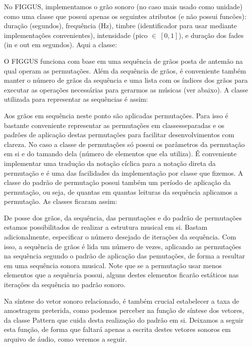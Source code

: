 No FIGGUS, implementamos o grão sonoro (no caso mais usado
como unidade) como uma classe que possui apenas
os seguintes atributos (e não possui funcões): duração (segundos),
frequência (Hz), timbre (identificador para usar mediante implementações convenientes), intensidade (pico $\in \ [0,1]$), e duração dos fades (in e out em segundos). Aqui a classe:



O FIGGUS funciona com base em uma sequência de grãos posta de antemão
na qual operam as permutações. Além da sequência de grãos,
é conveniente também manter o número de grãos da sequência e uma
lista com os índices dos grãos para executar as operações necessárias para gerarmos as músicas (ver abaixo). A classe utilizada para representar as sequências é assim:


Aos grãos em sequência neste ponto são aplicadas permutações.
Para isso é bastante conveniente representar as permutações em classesseparadas e os padrões de aplicação destas permutações para facilitar
desenvolvimentos com clareza. No caso a classe de permutações só possui os parâmetros da permutação em si e do tamando dela (número de elementos que ela utiliza). É conveniente implementar uma tradução da notação cíclica para a notação direta da permutação e é uma das facilidades da implementação por classe que fizemos. A classe do padrão de permutação possui também um período de aplicação da permutação, ou seja, de quantas em quantas leituras da sequência aplicamos a permutação. As classes ficaram assim:


De posse dos grãos, da sequência, das permutações e do padrão de permutações estamos possibilitados de realizar a estrutura musical em si. Bastam adicionalmente, especificar o número desejado de iterações da sequência. Com isso, a sequência de grãos é lida um número de vezes, aplicando as permutações na sequência segundo o padrão de aplicação das pemutações, de forma a resultar em uma sequência sonora musical. Note que se a permutação usar menos elementos que a sequência possui, alguns destes elementos ficarão estáticos nas iterações da sequência no padrão sonoro.

Na síntese do vetor sonoro relacionado, é também crucial estabelecer a taxa de amostragem preterida, como podemos perceber na função de síntese dos vetores, da classe Pattern que cuida desta realização do padrão em si. Deixamos a seguir esta função, de forma que faltará apenas a escrita destes vetores sonoros em arquivo de áudio, como veremos a seguir.

